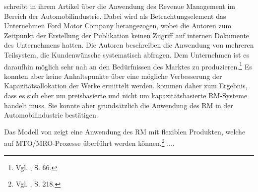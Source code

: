 \cite{Specht:2008aa} schreibt in ihrem Artikel über die Anwendung des Revenue Management im Bereich der Automobilindustrie. Dabei wird als Betrachtungselement das Unternehmen \glqq Ford Motor {Company\grqq} herangezogen, wobei die Autoren zum Zeitpunkt der Erstellung der Publikation keinen Zugriff auf internen Dokumente des Unternehmens hatten. Die Autoren beschreiben die Anwendung von mehreren Teilsystem, die Kundenwünsche systematisch abfragen. Dem Unternehmen ist es daraufhin möglich sehr nah an den Bedürfnissen des Marktes zu produzieren.\footnote{Vgl. \cite{Specht:2008aa}, S. 66.} Es konnten aber keine Anhaltspunkte über eine mögliche Verbesserung der Kapazitätsallokation der Werke ermittelt werden. \cite{Specht:2008aa} kommen daher zum Ergebnis, dass es sich eher um preisbasierte und nicht um kapazitätsbasierte RM-Systeme handelt muss. Sie konnte aber grundsätzlich die Anwendung des RM in der Automobilindustrie bestätigen.


Das Modell von \cite{petrick2012using} zeigt eine Anwendung des RM mit flexiblen Produkten, welche auf MTO/MRO-Prozesse überführt werden können.\footnote{Vgl. \cite{petrick2012using}, S. 218.} ....

